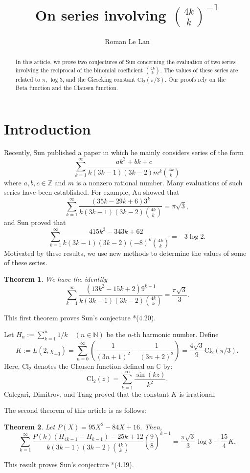 \documentclass{amsart}
\title{On series involving $\binom{4k}{k}^{-1}$}
\author{Roman Le Lan}
\numberwithin{equation}{section}
\newtheorem{theorem}{Theorem}
\newcommand{\Z}{\mathbb Z}
\newcommand{\N}{\mathbb N}
\newcommand{\C}{\mathbb C}
\begin{document}
\begin{abstract}
In this article, we prove two conjectures of Sun concerning the evaluation of two series involving the reciprocal of the binomial coefficient $\binom{4k}{k}$. The values of these series are related to $\pi$, $\log3$, and the Gieseking constant $\text{Cl}_2(\pi/3)$. Our proofs rely on the Beta function and the Clausen function.
\end{abstract}
\maketitle

\section{Introduction}
Recently, Sun published a paper \cite{series2} in which he mainly considers series of the form
\[\sum_{k=1}^\infty \frac{ak^2+bk+c}{k(3k-1)(3k-2)m^k\binom{4k}{k}}\]
where $a, b, c \in \Z$ and $m$ is a nonzero rational number.
Many evaluations of such series have been established. For example, Au \cite{Au} showed that
\begin{equation}
\sum_{k=1}^\infty \frac{(35k-29k+6)3^k}{k(3k-1)(3k-2)\binom{4k}{k}}=\pi\sqrt3,
\label{Au}
\end{equation}
and Sun \cite{series2} proved that
\begin{equation}
\sum_{k=1}^\infty \frac{415k^3-343k+62}{k(3k-1)(3k-2)(-8)^k\binom{4k}{k}}=-3\log2.
\label{Sun}   
\end{equation}
Motivated by these results, we use new methods to determine the values of some of these series.
\begin{theorem}
    We have the identity
    \[\sum_{k=1}^\infty  \frac{(13k^2-15k+2)9^{k-1}}{k(3k-1)(3k-2)\binom{4k}{k}}=\frac{\pi\sqrt3}{3}.\]
\end{theorem}
This first theorem proves Sun's conjecture \cite{series2}*{(4.20)}. 

Let $H_n:=\sum_{k=1}^n 1/k \quad (n\in\N)$ be the $n$-th harmonic number. Define
\[K:=L(2,\chi_{-3})=\sum_{n=0}^\infty\left(\frac{1}{(3n+1)^2}-\frac{1}{(3n+2)^2}\right)=\frac{4\sqrt3}{9}\text{Cl}_2(\pi/3).\]
Here, $\text{Cl}_2$ denotes the Clausen function defined on $\C$ by:
\[\text{Cl}_2(z)=\sum_{k=1}^\infty\frac{\sin(kz)}{k^2}.\]
Calegari, Dimitrov, and Tang \cite{cdt} proved that the constant $K$ is irrational. 

The second theorem of this article is as follows:
\begin{theorem}
    Let $P(X)=95X^2-84X+16$. Then,
    \[\sum_{k=1}^\infty  \frac{P(k)(H_{4k-1}-H_{k-1})-25k+12}{k(3k-1)(3k-2)\binom{4k}{k}}\left(\frac98\right)^{k-1}=\frac{\pi\sqrt3}{3}\log{3}+\frac{15}{4}K.\]
\end{theorem}
This result proves Sun's conjecture \cite{series2}*{(4.19)}.
\end{document}
